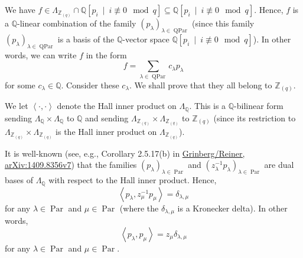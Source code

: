 \documentclass[10pt,a4paper]{article}
\begin{document}
We have $f\in\Lambda_{\mathbb{Z}_{\left(  q\right)  }}\cap\mathbb{Q}\left[
p_{i}\ \mid\ i\not \equiv 0\mod q\right]  \subseteq
\mathbb{Q}\left[  p_{i}\ \mid\ i\not \equiv 0\mod q\right]  $.
Hence, $f$ is a $\mathbb{Q}$-linear combination of the family $\left(
p_{\lambda}\right)  _{\lambda\in\operatorname{QPar}}$ (since this family
$\left(  p_{\lambda}\right)  _{\lambda\in\operatorname{QPar}}$ is a basis of
the $\mathbb{Q}$-vector space $\mathbb{Q}\left[  p_{i}\ \mid\ i\not \equiv
0\mod q\right]  $). In other words, we can write $f$ in the form
\begin{equation}
f=\sum_{\lambda\in\operatorname{QPar}}c_{\lambda}p_{\lambda}
\label{darij1.pf.t1.f=}
\tag{7}
\end{equation}
for some $c_{\lambda}\in\mathbb{Q}$. Consider these $c_{\lambda}$. We shall prove that they all belong to $\mathbb{Z}_{\left(q\right)}$.




We let $\left\langle \cdot,\cdot\right\rangle $ denote the Hall inner product
on $\Lambda_{\mathbb{Q}}$. This is a $\mathbb{Q}$-bilinear form sending
$\Lambda_{\mathbb{Q}}\times\Lambda_{\mathbb{Q}}$ to $\mathbb{Q}$ and sending
$\Lambda_{\mathbb{Z}_{\left(  q\right)  }}\times\Lambda_{\mathbb{Z}_{\left(
q\right)  }}$ to $\mathbb{Z}_{\left(  q\right)  }$ (since its restriction to
$\Lambda_{\mathbb{Z}_{\left(  q\right)  }}\times\Lambda_{\mathbb{Z}_{\left(
q\right)  }}$ is the Hall inner product on $\Lambda_{\mathbb{Z}_{\left(
q\right)  }}$).




It is well-known (see, e.g., Corollary 2.5.17(b) in \href{https://arxiv.org/abs/1409.8356v7}{Grinberg/Reiner,
arXiv:1409.8356v7}) that the families $\left(  p_{\lambda}\right)
_{\lambda\in\operatorname{Par}}$ and $\left(  z_{\lambda}^{-1}p_{\lambda
}\right)  _{\lambda\in\operatorname{Par}}$ are dual bases of $\Lambda
_{\mathbb{Q}}$ with respect to the Hall inner product. Hence,
\begin{equation}
\left\langle p_{\lambda},z_{\mu}^{-1}p_{\mu}\right\rangle =\delta_{\lambda
,\mu}
\label{darij1.pf.t1.dualbases}
\tag{8}
\end{equation}
for any $\lambda\in\operatorname{Par}$ and $\mu\in\operatorname{Par}$ (where
the $\delta_{\lambda,\mu}$ is a Kronecker delta). In other words,
\begin{equation}
\left\langle p_{\lambda},p_{\mu}\right\rangle =z_{\mu}\delta_{\lambda,\mu
}
\label{darij1.pf.t1.dualbases2}
\tag{9}
\end{equation}
for any $\lambda\in\operatorname{Par}$ and $\mu\in\operatorname{Par}$.
\end{document}
